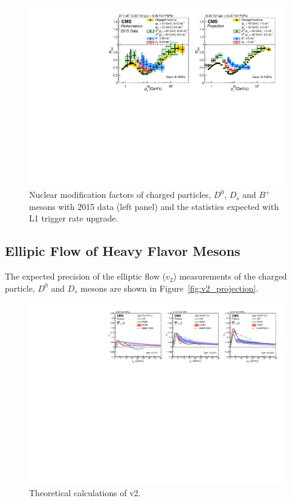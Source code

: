 \begin{figure}[!ht]
\begin{center}
\includegraphics[width=.90\textwidth]{figures/cRAA_lumiTG_3_lumiMB_1_v2.pdf}
\caption{Nuclear modification factors of charged particles, $D^0$, $D_s$ and $B^+$ mesons with 2015 data (left panel) and the statistics expected with L1 trigger rate upgrade.}
\label{fig:RAA_2015}
\end{center}
\end{figure}

\subsection{Ellipic Flow of Heavy Flavor Mesons}

The expected precision of the elliptic flow ($v_2$) measurements of the charged particle, $D^0$ and $D_s$ mesons are shown in Figure~\ref{fig:v2_projection}.

\begin{figure}[!ht]
\begin{center}
\includegraphics[width=.90\textwidth]{figures/cTheoryV2_D_v1.pdf}
\caption{Theoretical calculations of v2.}
\label{fig:v2_theory}
\end{center}
\end{figure}

